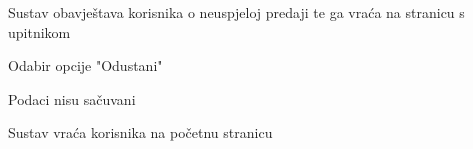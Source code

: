 \begin{packed_item}
\begin{packed_item}
\begin{packed_enum}
						\item Sustav obavještava korisnika o neuspjeloj predaji te ga vraća na stranicu s upitnikom						
					\end{packed_enum}
					
					\item[6.a] Odabir opcije "Odustani"
					\item[] \begin{packed_enum}
						
						\item Podaci nisu sačuvani
						\item Sustav vraća korisnika na početnu stranicu						
					\end{packed_enum}
					
				\end{packed_item}
				
			\end{packed_item}
			
